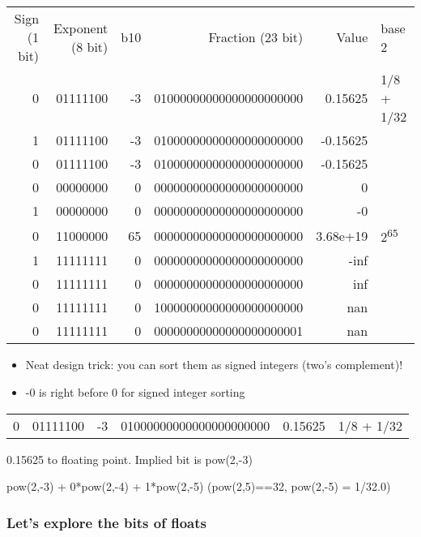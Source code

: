 \documentclass[11pt]{article}
\begin{document}
\begin{center}
\begin{tabular}{rrrrrl}
Sign (1 bit) & Exponent (8 bit) & b10 & Fraction (23 bit) & Value & base 2\\
0 & 01111100 & -3 & 01000000000000000000000 & 0.15625 & 1/8 + 1/32\\
1 & 01111100 & -3 & 01000000000000000000000 & -0.15625 & \\
0 & 01111100 & -3 & 01000000000000000000000 & -0.15625 & \\
0 & 00000000 & 0 & 00000000000000000000000 & 0 & \\
1 & 00000000 & 0 & 00000000000000000000000 & -0 & \\
0 & 11000000 & 65 & 00000000000000000000000 & 3.68e+19 & 2\textsuperscript{65}\\
1 & 11111111 & 0 & 00000000000000000000000 & -inf & \\
0 & 11111111 & 0 & 00000000000000000000000 & inf & \\
0 & 11111111 & 0 & 10000000000000000000000 & nan & \\
0 & 11111111 & 0 & 00000000000000000000001 & nan & \\
\end{tabular}
\end{center}

\begin{itemize}
\item Neat design trick: you can sort them as signed integers (two's complement)!
\item -0 is right before 0 for signed integer sorting
\end{itemize}

\begin{center}
\begin{tabular}{rrrrrl}
0 & 01111100 & -3 & 01000000000000000000000 & 0.15625 & 1/8 + 1/32\\
\end{tabular}
\end{center}

0.15625 to floating point. Implied bit is pow(2,-3)

pow(2,-3) + 0*pow(2,-4) + 1*pow(2,-5) (pow(2,5)==32, pow(2,-5) = 1/32.0)

\subsubsection{Let's explore the bits of floats}
\label{sec:org9ad7064}
\end{document}
